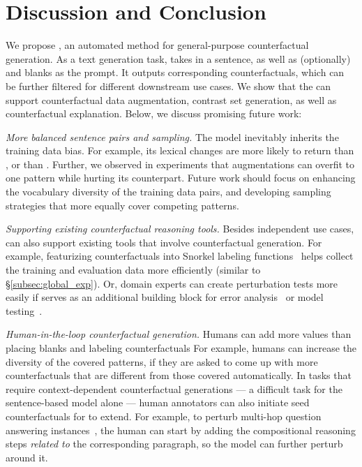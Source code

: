 \section{Discussion and Conclusion}
\label{sec:discuss}

We propose \sysname, an automated method for general-purpose counterfactual generation. 
As a text generation task, \sysname takes in a sentence, as well as (optionally) \tagstrs and blanks as the prompt.
It outputs corresponding counterfactuals, which can be further filtered for different downstream use cases. 
We show that the \sysname can support counterfactual data augmentation, contrast set generation, as well as counterfactual explanation.
Below, we discuss promising future work:

\emph{More balanced sentence pairs and sampling.}
The \sysname model inevitably inherits the training data bias.
For example, its lexical changes are more likely to return  than , or  than .
Further, we observed in \qqp experiments that augmentations can overfit to one pattern while hurting its counterpart. 
Future work should focus on enhancing the vocabulary diversity of the training data pairs, and developing sampling strategies that more equally cover competing patterns.

\emph{Supporting existing counterfactual reasoning tools.}
Besides independent use cases, \sysname can also support existing tools that involve counterfactual generation.
For example, featurizing counterfactuals into Snorkel labeling functions~\cite{ratner2017snorkel} helps collect the training and evaluation data more efficiently (similar to \S\ref{subsec:global_exp}).
Or, domain experts can create perturbation tests more easily if \sysname serves as an additional building block for error analysis~\cite{wu2019errudite} or model testing~\cite{checklist:acl20}.


\emph{Human-in-the-loop counterfactual generation.}
Humans can add more values than placing blanks and labeling counterfactuals
For example, humans can increase the diversity of the covered patterns, if they are asked to come up with more counterfactuals that are different from those covered automatically.
In tasks that require context-dependent counterfactual generations --- a difficult task for the sentence-based model alone --- human annotators can also initiate seed counterfactuals for \sysname to extend.
For example, to perturb multi-hop question answering instances~\cite{gardner2020contrast}, the human can start by adding the compositional reasoning steps \emph{related to} the corresponding paragraph, so the model can further perturb around it.